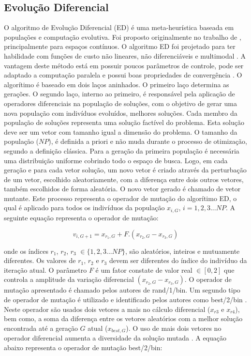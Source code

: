 \documentclass[12pt,A4,A4pt]{article}
\begin{document}
\subsection{Evolução Diferencial}
\label{ed}
\hspace{0.5cm}O algoritmo de Evolução Diferencial (ED) é uma meta-heurística baseada em populações e computação evolutiva. Foi proposto originalmente no trabalho de \cite{Storn1997}, principalmente para espaços contínuos. O algoritmo ED foi projetado para ter habilidade com funções de custo não lineares, não diferenciáveis e multimodal \citep{Storn1997}. A vantagem deste método está em possuir poucos parâmetros de controle, pode ser adaptado a computação paralela e possui boas propriedades de convergência \citep{Storn1997}. O algorítimo é baseado em dois laços aninhados. O primeiro laço determina as gerações. O segundo laço, interno ao primeiro, é responsável pela aplicação de operadores diferenciais na população de soluções, com o objetivo de gerar uma nova população com indivíduos evoluídos, melhores soluções. Cada membro da população de soluções representa uma solução factível do problema. Esta solução deve ser um vetor com tamanho igual a dimensão do problema. O tamanho da população ($NP$), é definida a priori e não muda durante o processo de otimização, segundo a definição clássica. Para a geração da primeira população é necessária uma distribuição uniforme cobrindo todo o espaço de busca. Logo, em cada geração e para cada vetor solução, um novo vetor é criado através da perturbação de um vetor, escolhido aleatoriamente, com a diferença entre dois outros vetores, também escolhidos de forma aleatória. O novo vetor gerado é chamado de vetor mutante. Este processo representa o operador de mutação do algorítimo ED, o qual é aplicado para todos os indivíduos da população $x_{i,G}$, $i = 1,2,3...NP$. A seguinte equação representa o operador de mutação:

\begin{equation}
v_{i,G+1} = x_{r_{1},G} + F . (x_{r_{2},G} - x_{r_{3},G}) \label{trial}
\end{equation}

onde os índices $r_{1}$, $r_{2}$, $r_{3}$ $\in \{1,2,3 ...NP\}$, são aleatórios, inteiros e mutuamente diferentes. Os valores de $r_{1}$, $r_{2}$ e $r_{3}$ devem ser diferentes do índice do indivíduo da iteração atual. O parâmetro $F$ é um fator constate de valor real $\in [0,2]$ que controla a amplitude da variação diferencial $(x_{r_{2},G} - x_{r_{3},G})$. O operador de mutação apresentado é chamado pelos autores de rand/1/bin. Um segundo tipo de operador de mutação é utilizado e identificado pelos autores como best/2/bin \citep{Storn1997}. Neste operador são usados dois vetores a mais no cálculo diferencial ($x_{r3}$ e $x_{r4}$), bem como, a soma da diferença entre os vetores aleatórios com a melhor solução encontrada até a geração $G$ atual ($x_{{best},G}$). O uso de mais dois vetores no operador diferencial aumenta a diversidade da solução mutada \citep{Storn1997}. A equação abaixo representa o operador de mutação best/2/bin:
\end{document}
